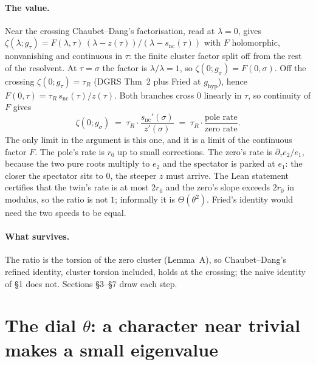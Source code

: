 \documentclass[11pt]{article}
\begin{document}
\paragraph{The value.} Near the crossing Chaubet--Dang's factorisation, read at $\lambda = 0$,
gives $\zeta(\lambda; g_\tau) = F(\lambda,\tau)\,(\lambda - z(\tau))/(\lambda - s_{\mathrm{nc}}(\tau))$
with $F$ holomorphic, nonvanishing and continuous in $\tau$: the finite cluster factor split off
from the rest of the resolvent. At $\tau = \sigma$ the factor is $\lambda/\lambda = 1$, so
$\zeta(0; g_\sigma) = F(0,\sigma)$. Off the crossing $\zeta(0; g_\tau) = \tau_R$ (DGRS Thm~2 plus
Fried at $g_{\mathrm{hyp}}$), hence $F(0,\tau) = \tau_R\, s_{\mathrm{nc}}(\tau)/z(\tau)$. Both
branches cross $0$ linearly in $\tau$, so continuity of $F$ gives
\[
\zeta(0; g_\sigma) \;=\; \tau_R \cdot \frac{s_{\mathrm{nc}}'(\sigma)}{z'(\sigma)}
\;=\; \tau_R \cdot \frac{\text{pole rate}}{\text{zero rate}} .
\]
The only limit in the argument is this one, and it is a limit of the continuous factor $F$.
The pole's rate is $r_0$ up to small corrections. The zero's rate is $\partial_\tau e_2 / e_1$,
because the two pure roots multiply to $e_2$ and the spectator is parked at $e_1$: the closer the
spectator sits to $0$, the steeper $z$ must arrive. The Lean statement certifies that the twin's
rate is at most $2r_0$ and the zero's slope exceeds $2r_0$ in modulus, so the ratio is not $1$;
informally it is $\Theta(\theta^2)$. Fried's identity would need the two speeds to be equal.

\paragraph{What survives.} The ratio is the torsion of the zero cluster (Lemma~A), so
Chaubet--Dang's refined identity, cluster torsion included, holds at the crossing; the naive
identity of \S1 does not. Sections \S3--\S7 draw each step.

\section{The dial $\theta$: a character near trivial makes a small eigenvalue}
\end{document}
